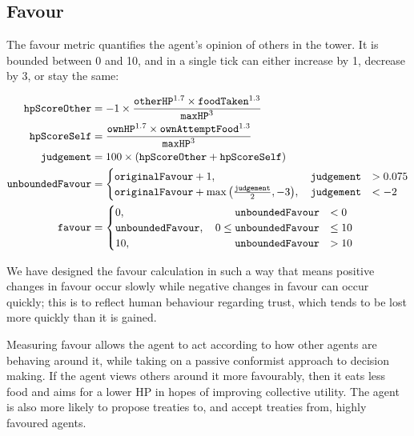 \subsection*{Favour}\label{sec:team5-favour}
The favour metric quantifies the agent's opinion of others in the tower. It is bounded between 0 and 10, and in a single tick can either increase by 1, decrease by 3, or stay the same:

\begin{align*}
    \texttt{hpScoreOther} &= -1 \times \frac{\texttt{otherHP}^{1.7} \times \texttt{foodTaken}^{1.3}}{\texttt{maxHP}^3}\\
    \texttt{hpScoreSelf} &= \frac{\texttt{ownHP}^{1.7}\times\texttt{ownAttemptFood}^{1.3}}{\texttt{maxHP}^3}\\
    \texttt{judgement} &= 100 \times (\texttt{hpScoreOther} + \texttt{hpScoreSelf})\\
    \texttt{unboundedFavour} &= \begin{cases}
        \texttt{originalFavour} + 1, \quad\hfill \texttt{judgement} &> 0.075\\
        \texttt{originalFavour} + \max{\left(\frac{\texttt{judgement}}{2}, -3\right)}, \quad\hfill\texttt{judgement} &< -2
    \end{cases}\\
    \texttt{favour} &= \begin{cases}
        0, \quad\hfill \texttt{unboundedFavour} &< 0\\
        \texttt{unboundedFavour}, \quad 0 \leq \texttt{unboundedFavour} &\leq 10\\
        10, \quad\hfill \texttt{unboundedFavour} &> 10
    \end{cases}\\
\end{align*}

We have designed the favour calculation in such a way that means positive changes in favour occur slowly while negative changes in favour can occur quickly; this is to reflect human behaviour regarding trust, which tends to be lost more quickly than it is gained.

Measuring favour allows the agent to act according to how other agents are behaving around it, while taking on a passive conformist approach to decision making. If the agent views others around it more favourably, then it eats less food and aims for a lower HP in hopes of improving collective utility. The agent is also more likely to propose treaties to, and accept treaties from, highly favoured agents.

